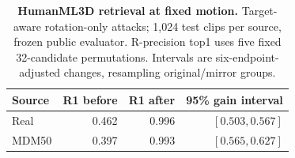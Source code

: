 \begin{table}[t]
\centering\small
\caption{\textbf{HumanML3D retrieval at fixed motion.} Target-aware rotation-only attacks; 1,024 test clips per source, frozen public evaluator. R-precision top1 uses five fixed 32-candidate permutations. Intervals are six-endpoint-adjusted changes, resampling original/mirror groups.}
\label{tab:humanml}
\begin{tabular}{lrrr}\toprule
Source&R1 before&R1 after&95\% gain interval\\\midrule
Real&0.462&0.996&$[0.503,0.567]$\\
MDM50&0.397&0.993&$[0.565,0.627]$\\
\bottomrule\end{tabular}\end{table}
